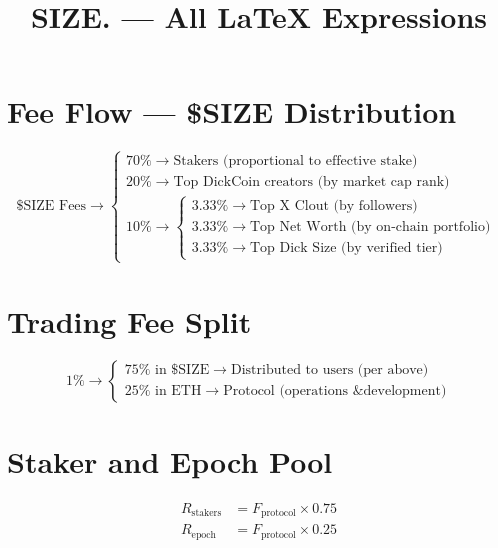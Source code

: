 \documentclass{article}
\title{\textbf{SIZE. --- All LaTeX Expressions}}
\date{}
\begin{document}
\maketitle

\section*{Fee Flow --- \$SIZE Distribution}

\[
\text{\$SIZE Fees} \longrightarrow
\begin{cases}
70\% \rightarrow \text{Stakers (proportional to effective stake)} \\[6pt]
20\% \rightarrow \text{Top DickCoin creators (by market cap rank)} \\[6pt]
10\% \rightarrow
  \begin{cases}
    3.33\% \rightarrow \text{Top X Clout (by followers)} \\[4pt]
    3.33\% \rightarrow \text{Top Net Worth (by on-chain portfolio)} \\[4pt]
    3.33\% \rightarrow \text{Top Dick Size (by verified tier)}
  \end{cases}
\end{cases}
\]

\section*{Trading Fee Split}

\[
1\% \longrightarrow
\begin{cases}
75\% \text{ in \$SIZE} \rightarrow \text{Distributed to users (per above)} \\[6pt]
25\% \text{ in ETH} \rightarrow \text{Protocol (operations \& development)}
\end{cases}
\]

\section*{Staker and Epoch Pool}

\[
\begin{aligned}
R_{\text{stakers}} &= F_{\text{protocol}} \times 0.75 \\[10pt]
R_{\text{epoch}}   &= F_{\text{protocol}} \times 0.25
\end{aligned}
\]

\end{document}
